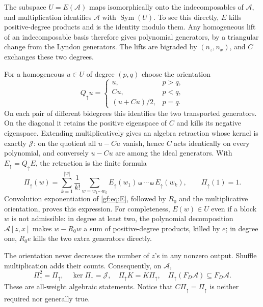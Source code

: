 The subspace $U=E(\mathcal A)$ maps isomorphically onto the
indecomposables of $\mathcal A$, and multiplication identifies
$\mathcal A$ with $\operatorname{Sym}(U)$. To see this directly, $E$ kills
positive-degree products and is the identity modulo them. Any homogeneous
lift of an indecomposable basis therefore gives polynomial generators,
by a triangular change from the Lyndon generators. The lifts are bigraded
by $(n_z,n_x)$, and $C$ exchanges these two degrees.

For a homogeneous $u\in U$ of degree $(p,q)$ choose the orientation
\[
 Q_{\uparrow}u=
 \begin{cases}
 u,&p>q,\\
 Cu,&p<q,\\
 (u+Cu)/2,&p=q.
 \end{cases}
\]
On each pair of different bidegrees this identifies the two transported
generators. On the diagonal it retains the positive eigenspace of $C$ and
kills its negative eigenspace. Extending multiplicatively gives an
algebra retraction whose kernel is exactly $\mathcal J$: on the quotient
all $u-Cu$ vanish, hence $C$ acts identically on every polynomial, and
conversely $u-Cu$ are among the ideal generators. With
$E_{\uparrow}=Q_{\uparrow}E$, the retraction is the finite formula
\begin{equation}
 \Pi_{\uparrow}(w)=\sum_{k=1}^{|w|}\frac1{k!}
       \sum_{w=w_1\cdots w_k}
       E_{\uparrow}(w_1)\shuffle\cdots\shuffle E_{\uparrow}(w_k),
 \qquad \Pi_{\uparrow}(1)=1.
 \label{gf:eq:Pi}
\end{equation}
Convolution exponentiation of \eqref{gf:eq:E}, followed by $R_0$ and
the multiplicative orientation, proves this expression. For completeness,
$E(w)\in U$ even if a block $w$ is not admissible: in degree at least two,
the polynomial decomposition $\mathcal A[z,x]$ makes $w-R_0w$ a sum of
positive-degree products, killed by $e$; in degree one, $R_0e$ kills the
two extra generators directly.

The orientation never decreases the number of $z$'s in any nonzero
output. Shuffle multiplication adds their counts. Consequently, on
$\mathcal A$,
\begin{equation}
 \Pi_{\uparrow}^2=\Pi_{\uparrow},\quad
 \ker\Pi_{\uparrow}=\mathcal J,\quad
 \Pi_{\uparrow}K=K\Pi_{\uparrow},\quad
 \Pi_{\uparrow}(F_D\mathcal A)\subseteq F_D\mathcal A.
 \label{gf:eq:projector-properties}
\end{equation}
These are all-weight algebraic statements. Notice that
$C\Pi_{\uparrow}=\Pi_{\uparrow}$ is neither required nor generally true.


